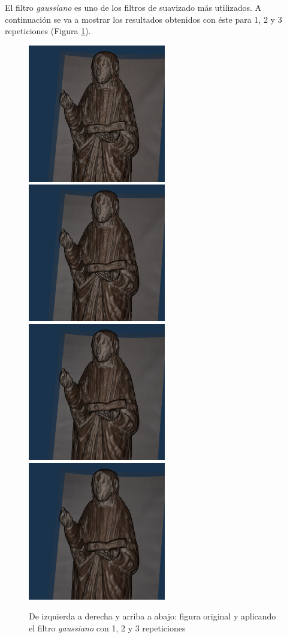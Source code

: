 El filtro \textit{gaussiano} es uno de los filtros de suavizado más utilizados. A continuación se va a mostrar los resultados obtenidos con éste para 1, 2 y 3 repeticiones (Figura \ref{fig:resultados/filtrado/gaussiano}).

\begin{figure}[H]
	\centering
	\includegraphics[width=6cm]{imagenes/resultados/filtrado/original}
	\includegraphics[width=6cm]{imagenes/resultados/filtrado/gaussiano-1}
	\includegraphics[width=6cm]{imagenes/resultados/filtrado/gaussiano-2}
	\includegraphics[width=6cm]{imagenes/resultados/filtrado/gaussiano-3}
	\caption{De izquierda a derecha y arriba a abajo: figura original y aplicando el filtro \textit{gaussiano} con 1, 2 y 3 repeticiones}
	\label{fig:resultados/filtrado/gaussiano}
\end{figure}

